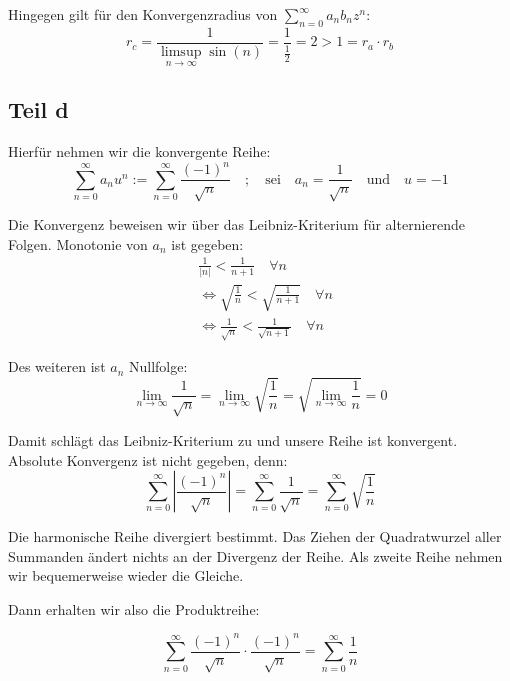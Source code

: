 \documentclass[a4paper,german,12pt,smallheadings]{scrartcl}
\begin{document}
Hingegen gilt für den Konvergenzradius von $\sum\limits_{n=0}^{\infty} a_n b_n
z^n$:
\begin{equation*}
r_c=\frac{1}{\limsup\limits_{n \to \infty} \sin(n)}=\frac{1}{\frac{1}{2}}=2>1=r_a \cdot r_b
\end{equation*}

\subsection*{Teil d}

Hierfür nehmen wir die konvergente Reihe:
\begin{equation*}
\sum\limits_{n=0}^{\infty} a_nu^n:=\sum\limits_{n=0}^{\infty} \frac{(-1)^n}{\sqrt{n}} \quad ; \quad \text{sei} \quad a_n=\frac{1}{\sqrt{n}} \quad \text{und} \quad u=-1
\end{equation*}

Die Konvergenz beweisen wir über das Leibniz-Kriterium für alternierende Folgen. Monotonie von $a_n$ ist gegeben:
\begin{align*}
  & \frac{1}{|n|}<\frac{1}{n+1} \quad \forall n\\
  & \Leftrightarrow \sqrt{\frac{1}{n}}<\sqrt{\frac{1}{n+1}} \quad \forall n\\
  & \Leftrightarrow \frac{1}{\sqrt{n}}< \frac{1}{\sqrt{n+1}} \quad \forall n
\end{align*}

Des weiteren ist $a_n$ Nullfolge:
\begin{equation}
\lim\limits_{n \to \infty} \frac{1}{\sqrt{n}}=\lim\limits_{n \to \infty} \sqrt{\frac{1}{n}}=\sqrt{\lim\limits_{n \to \infty} \frac{1}{n}}=0
\end{equation}

Damit schlägt das Leibniz-Kriterium zu und unsere Reihe ist konvergent. Absolute Konvergenz ist nicht gegeben, denn:
\begin{equation*}
\sum\limits_{n=0}^{\infty} \left|\frac{(-1)^n}{\sqrt{n}}\right| = \sum\limits_{n=0}^{\infty} \frac{1}{\sqrt{n}}=\sum\limits_{n=0}^{\infty} \sqrt{\frac{1}{n}}
\end{equation*}

Die harmonische Reihe divergiert bestimmt. Das Ziehen der Quadratwurzel aller
Summanden ändert nichts an der Divergenz der Reihe.  Als zweite Reihe nehmen
wir bequemerweise wieder die Gleiche.

Dann erhalten wir also die Produktreihe:

\begin{equation*}
  \sum\limits_{n=0}^{\infty} \frac{(-1)^n}{\sqrt{n}} \cdot \frac{(-1)^n}{\sqrt{n}}=\sum\limits_{n=0}^{\infty} \frac{1}{n}
\end{equation*}
\end{document}
